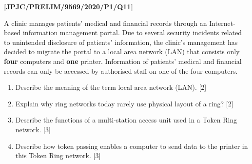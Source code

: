 \item \textbf{{[}JPJC/PRELIM/9569/2020/P1/Q11{]} }

A clinic manages patients\textquoteright{} medical and financial records
through an Internet-based information management portal. Due to several
security incidents related to unintended disclosure of patients\textquoteright{}
information, the clinic\textquoteright s management has decided to
migrate the portal to a local area network (LAN) that consists only
\textbf{four} computers and \textbf{one} printer. Information of patients\textquoteright{}
medical and financial records can only be accessed by authorised staff
on one of the four computers. 
\begin{enumerate}
\item Describe the meaning of the term local area network (LAN). \hfill{}{[}2{]}
\item Explain why ring networks today rarely use physical layout of a ring?
\hfill{}{[}2{]}
\item Describe the functions of a multi-station access unit used in a Token
Ring network. \hfill{}{[}3{]}
\item Describe how token passing enables a computer to send data to the
printer in this Token Ring network. \hfill{}{[}3{]}
\end{enumerate}